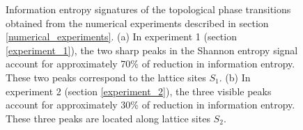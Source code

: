 \documentclass[10pt]{revtex4-1}
\begin{document}
\begin{figure}
\centering
{}\quad
{}\quad
\caption{Information entropy signatures of the topological phase transitions obtained from the numerical experiments described in section \ref{numerical_experiments}. (a) In experiment 1 (section \ref{experiment_1}), the two sharp peaks in the Shannon entropy signal account for approximately 70\% of reduction in information entropy. These two peaks correspond to the lattice sites $S_1$. (b) In experiment 2 (section \ref{experiment_2}), the three visible peaks account for approximately 30\% of reduction in information entropy. These three peaks are located along lattice sites $S_2$.}
\label{feature_importances}
\end{figure}
\end{document}
